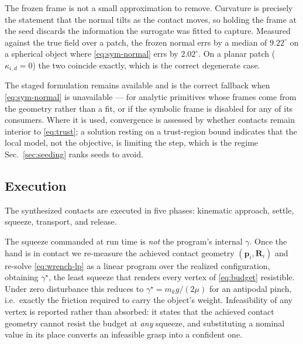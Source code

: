 The frozen frame is not a small approximation to remove. Curvature is precisely the
statement that the normal tilts as the contact moves, so holding the frame at the seed
discards the information the surrogate was fitted to capture. Measured against the
true field over a patch, the frozen normal errs by a median of $9.22^\circ$ on a
spherical object where \eqref{eq:sym-normal} errs by $2.02^\circ$. On a planar patch
($\kappa_{i,d} = 0$) the two coincide exactly, which is the correct degenerate case.

The staged formulation remains available and is the correct fallback when
\eqref{eq:sym-normal} is unavailable --- for analytic primitives whose frames come
from the geometry rather than a fit, or if the symbolic frame is disabled for any of
its consumers. Where it is used, convergence is assessed by whether contacts remain
interior to \eqref{eq:trust}; a solution resting on a trust-region bound indicates
that the local model, not the objective, is limiting the step, which is the regime
Sec.~\ref{sec:seeding} ranks seeds to avoid.

\subsection{Execution}
\label{sec:execution}

The synthesized contacts are executed in five phases: kinematic approach, settle,
squeeze, transport, and release.

The squeeze commanded at run time is \emph{not} the program's internal $\gamma$.
Once the hand is in contact we re-measure the achieved contact geometry
$(\bm{p}_i, \bm{R}_i)$ and re-solve \eqref{eq:wrench-lp} as a linear program
over the realized configuration, obtaining $\gamma^\star$, the least squeeze
that renders every vertex of \eqref{eq:budget} resistible. Under zero
disturbance this reduces to $\gamma^\star = m_k g / (2\mu)$ for an antipodal
pinch, i.e.\ exactly the friction required to carry the object's weight.
Infeasibility of any vertex is reported rather than absorbed: it states that the
achieved contact geometry cannot resist the budget at \emph{any} squeeze, and
substituting a nominal value in its place converts an infeasible grasp into a
confident one.

